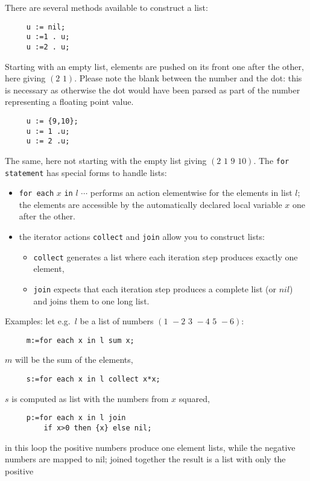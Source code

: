There are several methods available to construct a list: 
\begin{verbatim}
     u := nil;
     u :=1 . u;
     u :=2 . u;
\end{verbatim}
Starting with an empty list, elements are pushed on its front
one after the other, here giving $(2\,\, 1)$. Please note the
blank between the number and the dot: this is necessary as otherwise
the dot would have been parsed as part of the number representing a 
floating point value.
\begin{verbatim}
     u := {9,10};
     u := 1 .u;
     u := 2 .u;
\end{verbatim}
The same, here not starting with the empty list giving $(2\,\, 1\,\, 9\,\, 10)$.
The {\tt for statement}  has special forms
to  handle lists:
\begin{itemize}
\item {\tt for each} $x$ {\tt in} $l$ $\cdots$ performs an
  action elementwise for the elements in list $l$; the elements
  are accessible by the automatically declared local variable $x$
  one after the other.
\item the iterator actions {\tt collect} and {\tt join}
  allow you to construct lists: 
  \begin{itemize}
  \item {\tt collect} generates a list where each
       iteration step produces exactly one element,
  \item {\tt join} expects that each iteration step produces a 
       complete list (or $nil$) and joins them to one long list.
  \end{itemize}
\end{itemize}
Examples: let e.g.\ $l$ be a list of numbers 
$(1\,\, -2\,\, 3\,\, -4\,\, 5\,\, -6)$:
\begin{verbatim}
     m:=for each x in l sum x;
\end{verbatim}
$m$ will be the sum of the elements,
\begin{verbatim}
     s:=for each x in l collect x*x;
\end{verbatim}
$s$ is computed as list with the numbers from $x$ squared,
\begin{verbatim}
     p:=for each x in l join 
         if x>0 then {x} else nil;
\end{verbatim}
in this loop the positive numbers produce one element
lists, while the negative numbers are mapped to nil; joined
together the result is a list with only the positive
